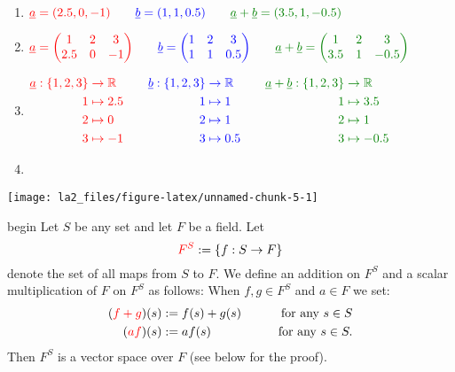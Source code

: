 \documentclass[
  12pt,
  a4paper,
  twoside]{article}
\theoremstyle{plain}
\theoremstyle{definition}
\begin{document}
\begin{enumerate}
\def\labelenumi{(\Roman{enumi})}
\setcounter{enumi}{1}
\item
  \({\color{red}{\underline{a} = (2.5,0,-1)}} \qquad {\color{blue}{\underline{b} = (1,1,0.5)}} \qquad {\color{green}{\underline{a}+\underline{b} = (3.5,1,-0.5)}}\)
\item
  \({\color{red}{\underline{a} = \begin{pmatrix} 1 & 2 & 3 \\ 2.5 & 0 & -1 \end{pmatrix}}} \qquad {\color{blue}{\underline{b} = \begin{pmatrix} 1 & 2 & 3 \\ 1 & 1 & 0.5 \end{pmatrix}}} \qquad {\color{green}{\underline{a}+\underline{b} = \begin{pmatrix} 1 & 2 & 3 \\ 3.5 & 1 & -0.5 \end{pmatrix}}}\)
\item
  \(\begin{aligned} {\color{red}{\underline{a}: \{ 1,2,3}} & {\color{red}{\} \to \mathbb{R}}} & \quad {\color{blue}{\underline{b}: \{ 1,2,3}} & {\color{blue}{\} \to \mathbb{R}}} & \quad {\color{green}{\underline{a}+\underline{b}: \{ 1,2,3}} & {\color{green}{\} \to \mathbb{R}}} \\ & {\color{red}{1 \mapsto 2.5}} & & {\color{blue}{1 \mapsto 1}} & & {\color{green}{1 \mapsto 3.5}} \\ & {\color{red}{2 \mapsto 0}} & & {\color{blue}{2 \mapsto 1}} & & {\color{green}{2 \mapsto 1}} \\ & {\color{red}{3 \mapsto -1}} & & {\color{blue}{3 \mapsto 0.5}} & & {\color{green}{3 \mapsto -0.5}} \end{aligned}\)
\item
\end{enumerate}

\begin{center}\texttt{[image: la2\_files/figure-latex/unnamed-chunk-5-1]} \end{center}

\csname begin\label{cnj:expl-mother}
Let \(S\) be any set and let \(F\) be a field. Let
\[ {\color{red}{F^S}} := \{ f: S \to F \} \]
denote the set of all maps from \(S\) to \(F\).
We define an addition on \(F^{S}\) and a scalar multiplication of \(F\) on \(F^{S}\) as follows:
When \(f,g \in F^{S}\) and \(a \in F\) we set:
\[ \begin{aligned} ({\color{red}{f+g}})(s) & := f(s) + g(s) \qquad & \text{for any } s \in S \\
({\color{red}{af}})(s) & := af(s) & \text{for any } s \in S. \end{aligned} \]
Then \(F^{S}\) is a vector space over \(F\) (see below for the proof).
\end{document}
